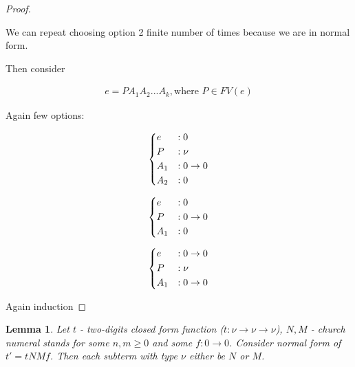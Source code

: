 \documentclass[11pt]{article}
\newtheorem{lemma}[theorem]{Lemma}
\newcommand{\too}{\rightarrow}
\begin{document}
\begin{proof}
\begin{enumerate}
    \end{enumerate}

    We can repeat choosing option 2 finite number of times because we are in normal form.

    Then consider

    \begin{align*}
        e = P A_1 A_2 ... A_k, \text{where \(P \in FV(e)\)}
    \end{align*}

    Again few options:

    \begin{align*}
        \begin{dcases}
            e &: 0 \\
            P &: \nu \\
            A_1 &: 0 \to 0 \\
            A_2 &: 0
        \end{dcases}
    \end{align*}

    \begin{align*}
        \begin{dcases}
            e &: 0 \\
            P &: 0 \to 0 \\
            A_1 &: 0 \\
        \end{dcases}
    \end{align*}

    \begin{align*}
        \begin{dcases}
            e &: 0 \to 0 \\
            P &: \nu \\
            A_1 &: 0 \to 0 \\
        \end{dcases}
    \end{align*}

    Again induction

\end{proof}

\begin{lemma}\label{l2}
    Let \(t\) - two-digits closed form function (\(t : \nu \too \nu \too \nu\)), \(N, M\) - church numeral stands for some \(n, m \geq 0\) and some \(f : 0 \too 0\). Consider normal form of \(t' = t N M f\). Then each subterm with type \(\nu\) either be \(N\) or \(M\).
\end{lemma}
\end{document}

